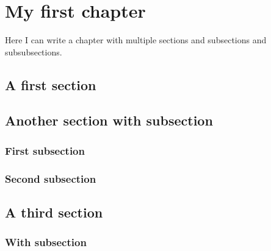 %
%
%



\chapter{My first chapter}
Here I can write a chapter with multiple sections and subsections and subsubsections.

\section{A first section}

\section{Another section with subsection}

\subsection{First subsection}

\subsection{Second subsection}

\section{A third section}

\subsection{With subsection}